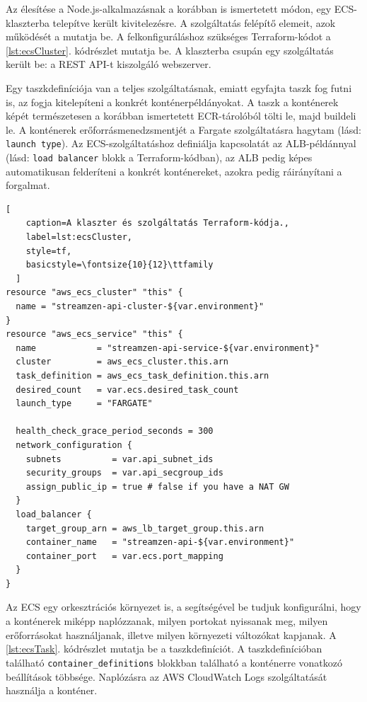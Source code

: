 Az élesítése a Node.js-alkalmazásnak a korábban is ismertetett módon, egy ECS-klaszterba telepítve került kivitelezésre. A szolgáltatás felépítő elemeit, azok működését a  mutatja be. A felkonfiguráláshoz szükséges Terraform-kódot a \ref{lst:ecsCluster}. kódrészlet mutatja be. A klaszterba csupán egy szolgáltatás került be: a REST API-t kiszolgáló webszerver.

Egy taszkdefiníciója van a teljes szolgáltatásnak, emiatt egyfajta taszk fog futni is, az fogja kitelepíteni a konkrét konténerpéldányokat. A taszk a konténerek képét természetesen a korábban ismertetett ECR-tárolóból tölti le, majd buildeli le. A konténerek erőforrásmenedzsmentjét a Fargate szolgáltatásra hagytam (lásd: \verb|launch type|). Az ECS-szolgáltatáshoz definiálja kapcsolatát az ALB-példánnyal (lásd: \verb|load balancer| blokk a Terraform-kódban), az ALB pedig képes automatikusan felderíteni a konkrét konténereket, azokra pedig ráirányítani a forgalmat.

\begin{minipage}{0.92\textwidth}
  \begin{lstlisting}[
    caption=A klaszter és szolgáltatás Terraform-kódja.,
    label=lst:ecsCluster,
    style=tf,
    basicstyle=\fontsize{10}{12}\ttfamily
  ]
resource "aws_ecs_cluster" "this" {
  name = "streamzen-api-cluster-${var.environment}"
}
resource "aws_ecs_service" "this" {
  name            = "streamzen-api-service-${var.environment}"
  cluster         = aws_ecs_cluster.this.arn
  task_definition = aws_ecs_task_definition.this.arn
  desired_count   = var.ecs.desired_task_count
  launch_type     = "FARGATE"

  health_check_grace_period_seconds = 300
  network_configuration {
    subnets          = var.api_subnet_ids
    security_groups  = var.api_secgroup_ids
    assign_public_ip = true # false if you have a NAT GW
  }
  load_balancer {
    target_group_arn = aws_lb_target_group.this.arn
    container_name   = "streamzen-api-${var.environment}"
    container_port   = var.ecs.port_mapping
  }
}
\end{lstlisting}
\end{minipage}

Az ECS egy orkesztrációs környezet is, a segítségével be tudjuk konfigurálni, hogy a konténerek miképp naplózzanak, milyen portokat nyissanak meg, milyen erőforrásokat használjanak, illetve milyen környezeti változókat kapjanak. A \ref{lst:ecsTask}. kódrészlet mutatja be a taszkdefiníciót. A taszkdefinícióban található \verb|container_definitions| blokkban található a konténerre vonatkozó beállítások többsége. Naplózásra az AWS CloudWatch Logs szolgáltatását használja a konténer.


